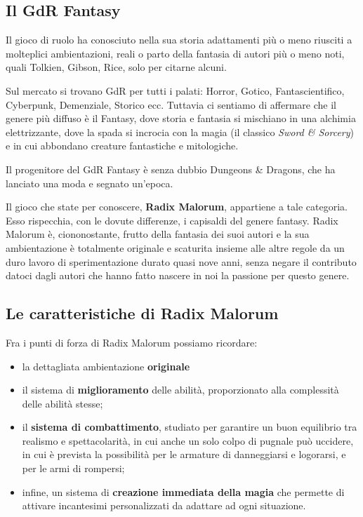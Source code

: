 \subsection{Il GdR Fantasy}

Il gioco di ruolo ha conosciuto nella sua storia adattamenti pi\`u o
meno riusciti a molteplici ambientazioni, reali o parto della fantasia
di autori pi\`u o meno noti, quali Tolkien, Gibson, Rice, solo per
citarne alcuni.

Sul mercato si trovano GdR per tutti i palati: Horror, Gotico,
Fantascientifico, Cyberpunk, Demenziale, Storico ecc. Tuttavia ci
sentiamo di affermare che il genere pi\`u diffuso \`e il Fantasy,
dove storia e fantasia si mischiano in una alchimia elettrizzante,
dove la spada si incrocia con la magia (il classico \textit{Sword \&
  Sorcery}) e in cui abbondano creature fantastiche e mitologiche.

Il progenitore del GdR Fantasy \`e senza dubbio Dungeons \& Dragons,
che ha lanciato una moda e segnato un'epoca.

Il gioco che state per conoscere, \textbf{Radix Malorum}, appartiene a
tale categoria. Esso rispecchia, con le dovute differenze, i capisaldi
del genere fantasy. Radix Malorum \`e, ciononostante, frutto della
fantasia dei suoi autori e la sua ambientazione \`e totalmente
originale e scaturita insieme alle altre regole da un duro lavoro di
sperimentazione durato quasi nove anni, senza negare il contributo
datoci dagli autori che hanno fatto nascere in noi la passione per
questo genere.

{\sloppy\raggedright \subsection{Le caratteristiche di Radix Malorum}}

Fra i punti di forza di Radix Malorum possiamo ricordare:

\begin{itemize}

\item la dettagliata ambientazione \textbf{originale}

\item il sistema di \textbf{miglioramento} delle
abilit\`a, proporzionato alla complessit\`a delle abilit\`a
stesse;

\item il \textbf{sistema di combattimento}, studiato per garantire
un buon equilibrio tra realismo e spettacolarit\`a, in cui anche un
solo colpo di pugnale pu\`o uccidere, in cui \`e prevista la
possibilit\`a per le armature di danneggiarsi e logorarsi, e per le
armi di rompersi; 

\item infine, un sistema di \textbf{creazione immediata
della magia} che permette di attivare incantesimi personalizzati da
adattare ad ogni situazione.

\end{itemize}

